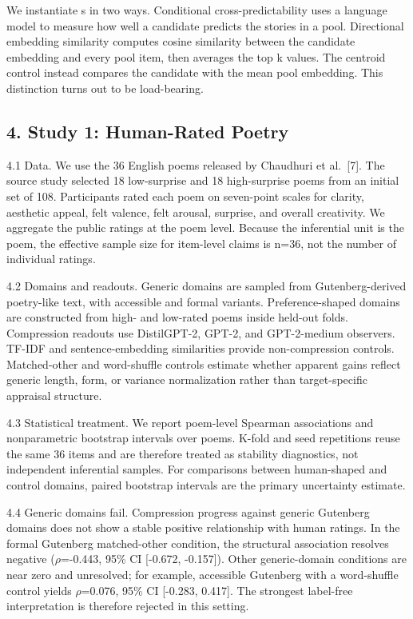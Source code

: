 \documentclass[
]{article}
\begin{document}
We instantiate s in two ways. Conditional cross-predictability uses a
language model to measure how well a candidate predicts the stories in a
pool. Directional embedding similarity computes cosine similarity
between the candidate embedding and every pool item, then averages the
top k values. The centroid control instead compares the candidate with
the mean pool embedding. This distinction turns out to be load-bearing.

\subsection{4. Study 1: Human-Rated
Poetry}\label{study-1-human-rated-poetry}

4.1 Data. We use the 36 English poems released by Chaudhuri et
al.~{[}7{]}. The source study selected 18 low-surprise and 18
high-surprise poems from an initial set of 108. Participants rated each
poem on seven-point scales for clarity, aesthetic appeal, felt valence,
felt arousal, surprise, and overall creativity. We aggregate the public
ratings at the poem level. Because the inferential unit is the poem, the
effective sample size for item-level claims is n=36, not the number of
individual ratings.

4.2 Domains and readouts. Generic domains are sampled from
Gutenberg-derived poetry-like text, with accessible and formal variants.
Preference-shaped domains are constructed from high- and low-rated poems
inside held-out folds. Compression readouts use DistilGPT-2, GPT-2, and
GPT-2-medium observers. TF-IDF and sentence-embedding similarities
provide non-compression controls. Matched-other and word-shuffle
controls estimate whether apparent gains reflect generic length, form,
or variance normalization rather than target-specific appraisal
structure.

4.3 Statistical treatment. We report poem-level Spearman associations
and nonparametric bootstrap intervals over poems. K-fold and seed
repetitions reuse the same 36 items and are therefore treated as
stability diagnostics, not independent inferential samples. For
comparisons between human-shaped and control domains, paired bootstrap
intervals are the primary uncertainty estimate.

4.4 Generic domains fail. Compression progress against generic Gutenberg
domains does not show a stable positive relationship with human ratings.
In the formal Gutenberg matched-other condition, the structural
association resolves negative (\(\rho\)=-0.443, 95\% CI {[}-0.672,
-0.157{]}). Other generic-domain conditions are near zero and
unresolved; for example, accessible Gutenberg with a word-shuffle
control yields \(\rho\)=0.076, 95\% CI {[}-0.283, 0.417{]}. The
strongest label-free interpretation is therefore rejected in this
setting.
\end{document}

